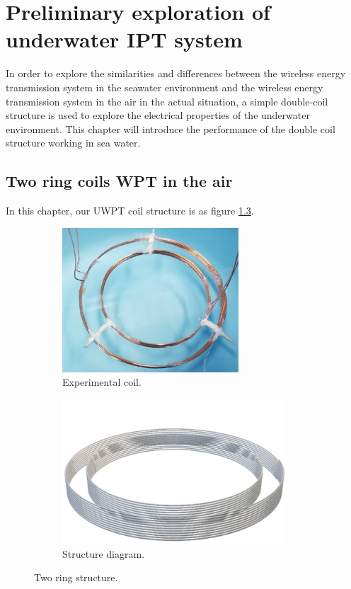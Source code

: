 \chapter{Preliminary exploration of underwater IPT system}

In order to explore the similarities and differences between the wireless energy transmission system in the seawater environment and the wireless energy transmission system in the air in the actual situation, a simple double-coil structure is used to explore the electrical properties of the underwater environment. This chapter will introduce the performance of the double coil structure working in sea water.




\section{Two ring coils WPT in the air}
In this chapter, our UWPT coil structure is as figure \ref{fig:3_two_ring_coil}.


\begin{figure}[htbp]
    \begin{subfigure}{0.5\textwidth}
        \centering
        \includegraphics[width=0.9\linewidth, height=5.4cm]{images/3_two_ring_coil.png}
        \caption{Experimental coil.}
        \label{fig:subim1}
    \end{subfigure}
    \begin{subfigure}{0.5\textwidth}
        \centering
        \includegraphics[width=0.9\linewidth, height=5.4cm]{images/3_two_ring_coil_structure.png}
        \caption{Structure diagram.}
        \label{fig:subim2}
    \end{subfigure}

    \caption{Two ring structure.}
    \label{fig:3_two_ring_coil}
\end{figure}

